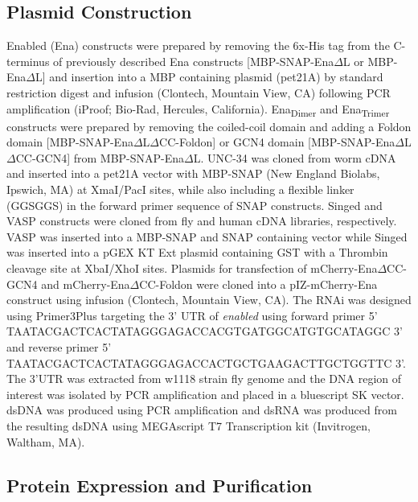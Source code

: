 \subsection{Plasmid Construction}\label{ena-mm-plasmid}

Enabled (Ena) constructs were prepared by removing the 6x-His tag from the C-terminus of previously described Ena constructs [MBP-SNAP-Ena$\Delta$L or MBP-Ena$\Delta$L] \citep{winkelman_ena/vasp_2014} and insertion into a MBP containing plasmid (pet21A) by standard restriction digest and infusion (Clontech, Mountain View, CA) following PCR amplification (iProof; Bio-Rad, Hercules, California). Ena\textsubscript{Dimer} and Ena\textsubscript{Trimer} constructs were prepared by removing the coiled-coil domain and adding a Foldon domain \citep{guthe_very_2004,papanikolopoulou_formation_2004} [MBP-SNAP-Ena$\Delta$L$\Delta$CC-Foldon] or GCN4 domain \citep{harbury_switch_1993} [MBP-SNAP-Ena$\Delta$L$\Delta$CC-GCN4] from MBP-SNAP-Ena$\Delta$L. UNC-34 was cloned from worm cDNA and inserted into a pet21A vector with MBP-SNAP (New England Biolabs, Ipswich, MA) at XmaI/PacI sites, while also including a flexible linker (GGSGGS) in the forward primer sequence of SNAP constructs. Singed and VASP constructs were cloned from fly and human cDNA libraries, respectively. VASP was inserted into a MBP-SNAP and SNAP containing vector while Singed was inserted into a pGEX KT Ext plasmid containing GST with a Thrombin cleavage site at XbaI/XhoI sites. Plasmids for transfection of mCherry-Ena$\Delta$CC-GCN4 and mCherry-Ena$\Delta$CC-Foldon were cloned into a pIZ-mCherry-Ena \citep{bilancia_enabled_2014} construct using infusion (Clontech, Mountain View, CA). The RNAi was designed using Primer3Plus \citep{untergasser_primer3new_2012} targeting the 3' UTR of \textit{enabled} using forward primer 5' TAATACGACTCACTATAGGGAGACCACGTGATGGCATGTGCATAGGC 3' and reverse primer 5' TAATACGACTCACTATAGGGAGACCACTGCTGAAGACTTGCTGGTTC 3'. The 3'UTR was extracted from w1118 strain fly genome and the DNA region of interest was isolated by PCR amplification and placed in a bluescript SK vector. dsDNA was produced using PCR amplification and dsRNA was produced from the resulting dsDNA using MEGAscript T7 Transcription kit (Invitrogen, Waltham, MA).

\subsection{Protein Expression and Purification}\label{ena-mm-protein-purification}

